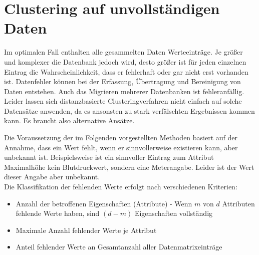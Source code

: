 \documentclass[11pt,ceqn]{book}
\begin{document}
\section{Clustering auf unvollständigen Daten}
Im optimalen Fall enthalten alle gesammelten Daten Werteeinträge. Je größer und komplexer die Datenbank jedoch wird, desto größer ist für jeden einzelnen Eintrag die Wahrscheinlichkeit, dass er fehlerhaft oder gar nicht erst vorhanden ist. Datenfehler können bei der Erfassung, Übertragung und Bereinigung von Daten entstehen. Auch das Migrieren mehrerer Datenbanken ist fehleranfällig. \\

Leider lassen sich distanzbasierte Clusteringverfahren nicht einfach auf solche Datensätze anwenden, da es ansonsten zu stark verfälschten Ergebnissen kommen kann. Es braucht also alternative Ansätze.

Die Voraussetzung der im Folgenden vorgestellten Methoden basiert auf der Annahme, dass ein Wert fehlt, wenn er sinnvollerweise existieren kann, aber unbekannt ist. Beispielsweise ist ein sinnvoller Eintrag zum Attribut Maximalhöhe kein Blutdruckwert, sondern eine Meterangabe. Leider ist der Wert dieser Angabe aber unbekannt.\\

Die Klassifikation der fehlenden Werte erfolgt nach verschiedenen Kriterien:

\begin{itemize}
\item Anzahl der betroffenen Eigenschaften (Attribute) - Wenn $m$ von $d$ Attributen fehlende Werte haben, sind $(d-m)$ Eigenschaften vollständig
\item Maximale Anzahl fehlender Werte je Attribut
\item Anteil fehlender Werte an Gesamtanzahl aller Datenmatrixeinträge
\end{itemize}
\end{document}
